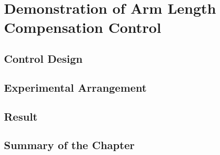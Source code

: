 \chapter{Demonstration of Arm Length Compensation Control}




\section{Control Design}
\subsection{}
\subsection{}
\subsection{}




\section{Experimental Arrangement}
\subsection{}
\subsection{}
\subsection{}




\section{Result}
\subsection{}
\subsection{}
\subsection{}




\section{Summary of the Chapter}
